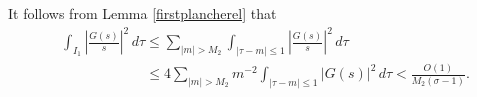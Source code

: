\documentclass[11pt]{amsart}
\theoremstyle{definition}
\newcommand{\NN}{{\mathcal N}}
\newcommand{\Z}{{\mathbb Z}}
\begin{document}

  It follows from Lemma  \ref{firstplancherel} that
 \begin{equation}\label{a2}
    \begin{split}
      & \int_{I_{1}}\left|\frac{G(s)}{s}\right|^{2}\,d\tau
       \leq \sum_{\vert m\vert>M_{2}}\int_{\vert\tau-m\vert\leq 1} \left|\frac{G(s)}{s}\right|^{2}\,d\tau \\& \quad\quad\quad\quad\quad\quad
       \leq 4\sum_{\vert m\vert>M_{2}} m^{-2}\int_{\vert\tau-m\vert\leq 1} \left|G(s)\right|^{2}\,d\tau
       <\frac{O(1)}{M_{2}(\sigma-1)}.
    \end{split}
 \end{equation}
 
 



\end{document}
